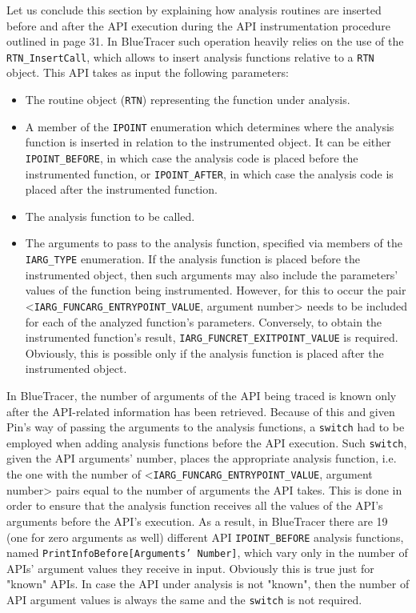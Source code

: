 Let us conclude this section by explaining how analysis routines are inserted before and after the API execution during the API instrumentation procedure outlined in page 31. In BlueTracer such operation heavily relies on the use of the \texttt{RTN\_InsertCall}, which allows to insert analysis functions relative to a \texttt{RTN} object. This API takes as input the following parameters:
\begin{itemize}
\item The routine object (\texttt{RTN}) representing the function under analysis.
\item A member of the \texttt{IPOINT} enumeration which determines where the analysis function is inserted in relation to the instrumented object. It can be either \texttt{IPOINT\_BEFORE}, in which case the analysis code is placed before the instrumented function, or \texttt{IPOINT\_AFTER}, in which case the analysis code is placed after the instrumented function.
\item The analysis function to be called.
\item The arguments to pass to the analysis function, specified via members of the \texttt{IARG\_TYPE} enumeration. If the analysis function is placed before the instrumented object, then such arguments may also include the parameters' values of the function being instrumented. However, for this to occur the pair <\texttt{IARG\_FUNCARG\_ENTRYPOINT\_VALUE}, argument number> needs to be included for each of the analyzed function's parameters. Conversely, to obtain the instrumented function's result, \texttt{IARG\_FUNCRET\_EXITPOINT\_VALUE} is required. Obviously, this is possible only if the analysis function is placed after the instrumented object.
\end{itemize}

In BlueTracer, the number of arguments of the API being traced is known only after the API-related information has been retrieved. Because of this and given Pin's way of passing the arguments to the analysis functions, a \texttt{switch} had to be employed when adding analysis functions before the API execution. Such \texttt{switch}, given the API arguments' number, places the appropriate analysis function, i.e. the one with the number of <\texttt{IARG\_FUNCARG\_ENTRYPOINT\_VALUE}, argument number> pairs equal to the number of arguments the API takes. This is done in order to ensure that the analysis function receives all the values of the API's arguments before the API's execution. As a result, in BlueTracer there are 19 (one for zero arguments as well) different API \texttt{IPOINT\_BEFORE} analysis functions, named \texttt{PrintInfoBefore[Arguments' Number]}, which vary only in the number of APIs' argument values they receive in input. Obviously this is true just for "known" APIs. In case the API under analysis is not "known", then the number of API argument values is always the same and the \texttt{switch} is not required.

